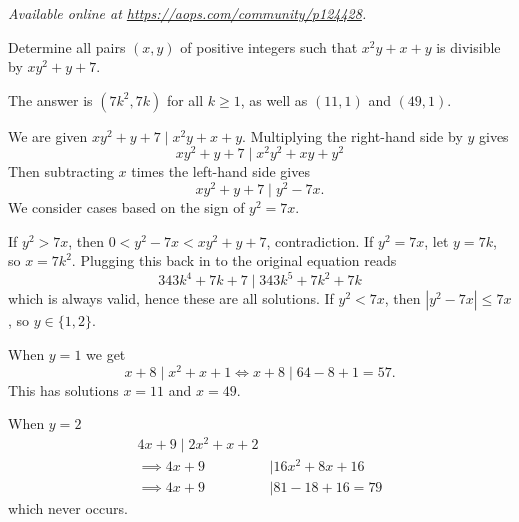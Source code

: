 \textsl{Available online at \url{https://aops.com/community/p124428}.}
\begin{mdframed}[style=mdpurplebox,frametitle={Problem statement}]
Determine all pairs $(x,y)$ of positive integers
such that $x^{2}y+x+y$ is divisible by $xy^{2}+y+7$.
\end{mdframed}
The answer is $(7k^2,7k)$ for all $k \ge 1$,
as well as $(11,1)$ and $(49,1)$.

We are given $xy^2+y+7 \mid x^2y+x+y$.
Multiplying the right-hand side by $y$ gives
\[ xy^2+y+7 \mid x^2y^2+xy+y^2 \]
Then subtracting $x$ times the left-hand side gives
\[ xy^2+y+7 \mid y^2-7x. \]
We consider cases based on the sign of $y^2=7x$.
\begin{itemize}
  \ii If $y^2 > 7x$, then $0 < y^2-7x < xy^2+y+7$,
  contradiction.
  \ii If $y^2=7x$, let $y = 7k$, so $x = 7k^2$.
  Plugging this back in to the original equation reads
  \[ 343k^4 + 7k + 7 \mid 343k^5 + 7k^2 + 7k \]
  which is always valid, hence these are all solutions.
  \ii  If $y^2 < 7x$, then $|y^2-7x| \le 7x$,
  so $y \in \{1,2\}$.

  When $y=1$ we get
  \[ x+8 \mid x^2+x+1 \iff x+8 \mid 64-8+1=57.\]
  This has solutions $x=11$ and $x=49$.

  When $y=2$
  \begin{align*}
    4x+9 \mid 2x^2+x+2 \\
    \implies 4x+9 &\mid 16x^2+8x+16 \\
    \implies 4x+9 &\mid 81-18+16 = 79
  \end{align*}
  which never occurs.
\end{itemize}
\pagebreak